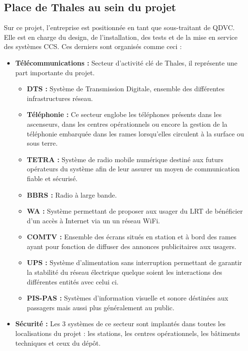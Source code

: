 \subsection{Place de Thales au sein du projet}

Sur ce projet, l'entreprise est positionnée en tant que sous-traitant de QDVC. Elle est en charge du design, de l'installation, des tests et de la mise en service des systèmes \gls{CCS}. Ces derniers sont organisés comme ceci :

\begin{itemize}
\item \textbf{Télécommunications :} Secteur d'activité clé de Thales, il représente une part importante du projet.
\begin{itemize}
\item \textbf{\gls{DTS} :} Système de Transmission Digitale, ensemble des différentes infrastructures réseau.
\item \textbf{Téléphonie :} Ce secteur englobe les téléphones présents dans les ascenseurs, dans les centres opérationnels ou encore la gestion de la téléphonie embarquée dans les rames lorsqu'elles circulent à la surface ou sous terre.
\item \textbf{\gls{TETRA} :} Système de radio mobile numérique destiné aux futurs opérateurs du système afin de leur assurer un moyen de communication fiable et sécurisé. 
\item \textbf{\gls{BBRS} :} Radio à large bande. %
\item \textbf{\gls{WA} :} Système permettant de proposer aux usager du LRT de bénéficier d'un accès à Internet via un un réseau WiFi.
\item \textbf{\gls{COMTV} :} Ensemble des écrans situés en station et à bord des rames ayant pour fonction de diffuser des annonces publicitaires aux usagers.
\item \textbf{\gls{UPS} :} Système d'alimentation sans interruption permettant de garantir la stabilité du réseau électrique quelque soient les interactions des différentes entités avec celui ci.
\item \textbf{\gls{PIS}-\gls{PAS} :} Systèmes d'information visuelle et sonore déstinées aux passagers mais aussi plus généralement au public.
\end{itemize}
\item \textbf{Sécurité :} Les 3 systèmes de ce secteur sont implantés dans toutes les localisations du projet : les stations, les centres opérationnels, les bâtiments techniques et ceux du dépôt.

\end{itemize}
